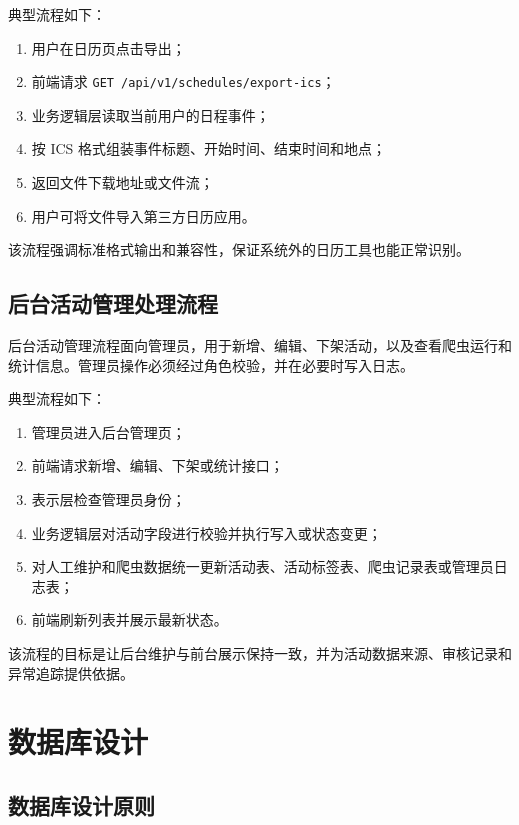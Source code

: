 \documentclass[UTF8,a4paper,12pt,fontset=none]{ctexrep}
\providecommand{\tightlist}{}
\begin{document}
典型流程如下：

\begin{enumerate}
\def\labelenumi{\arabic{enumi}.}
\tightlist
\item
  用户在日历页点击导出；
\item
  前端请求 \texttt{GET\ /api/v1/schedules/export-ics}；
\item
  业务逻辑层读取当前用户的日程事件；
\item
  按 ICS 格式组装事件标题、开始时间、结束时间和地点；
\item
  返回文件下载地址或文件流；
\item
  用户可将文件导入第三方日历应用。
\end{enumerate}

该流程强调标准格式输出和兼容性，保证系统外的日历工具也能正常识别。

\subsection{后台活动管理处理流程}\label{ux540eux53f0ux6d3bux52a8ux7ba1ux7406ux5904ux7406ux6d41ux7a0b}

后台活动管理流程面向管理员，用于新增、编辑、下架活动，以及查看爬虫运行和统计信息。管理员操作必须经过角色校验，并在必要时写入日志。

典型流程如下：

\begin{enumerate}
\def\labelenumi{\arabic{enumi}.}
\tightlist
\item
  管理员进入后台管理页；
\item
  前端请求新增、编辑、下架或统计接口；
\item
  表示层检查管理员身份；
\item
  业务逻辑层对活动字段进行校验并执行写入或状态变更；
\item
  对人工维护和爬虫数据统一更新活动表、活动标签表、爬虫记录表或管理员日志表；
\item
  前端刷新列表并展示最新状态。
\end{enumerate}

该流程的目标是让后台维护与前台展示保持一致，并为活动数据来源、审核记录和异常追踪提供依据。

\section{数据库设计}\label{ux6570ux636eux5e93ux8bbeux8ba1}

\subsection{数据库设计原则}\label{ux6570ux636eux5e93ux8bbeux8ba1ux539fux5219}
\end{document}
